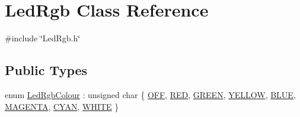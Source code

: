 \hypertarget{class_led_rgb}{}\section{Led\+Rgb Class Reference}
\label{class_led_rgb}


{\ttfamily \#include \char`\"{}Led\+Rgb.\+h\char`\"{}}

\subsection*{Public Types}
\begin{DoxyCompactItemize}
\item 
enum \hyperlink{class_led_rgb_af328c665510f921f0dfed643f939087b}{Led\+Rgb\+Colour} \+: unsigned char \{ \newline
\hyperlink{class_led_rgb_af328c665510f921f0dfed643f939087bafa756b630af74b887096f90549a19eb2}{O\+FF}, 
\hyperlink{class_led_rgb_af328c665510f921f0dfed643f939087bad4594f28e25fb32eabf7a9d648ba5486}{R\+ED}, 
\hyperlink{class_led_rgb_af328c665510f921f0dfed643f939087ba8cabace225f1edbe38153816b604671e}{G\+R\+E\+EN}, 
\hyperlink{class_led_rgb_af328c665510f921f0dfed643f939087ba72e005fe358740655546dd715d5b734d}{Y\+E\+L\+L\+OW}, 
\newline
\hyperlink{class_led_rgb_af328c665510f921f0dfed643f939087bae717dcfc60bfe087c8890aa0884b2eee}{B\+L\+UE}, 
\hyperlink{class_led_rgb_af328c665510f921f0dfed643f939087ba05943407d36a27b34f6c2e60290061f5}{M\+A\+G\+E\+N\+TA}, 
\hyperlink{class_led_rgb_af328c665510f921f0dfed643f939087ba1718c136915fce13ae47066acbe861ad}{C\+Y\+AN}, 
\hyperlink{class_led_rgb_af328c665510f921f0dfed643f939087ba00db6e86f434a54a72f54a0efab84aff}{W\+H\+I\+TE}
 \}
\end{DoxyCompactItemize}
